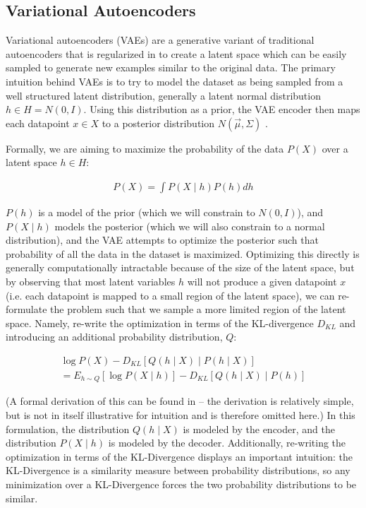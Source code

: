 \subsection{Variational Autoencoders}

Variational autoencoders (VAEs) are a generative variant of
traditional autoencoders that is regularized in to create a latent
space which can be easily sampled to generate new examples similar to
the original data. The primary intuition behind VAEs is to try to
model the dataset as being sampled from a well structured latent
distribution, generally a latent normal distribution $h \in H =
N(0,I)$. Using this distribution as a prior, the VAE encoder then
maps each datapoint $x \in X$ to a posterior distribution
$N(\vec{\mu}, \Sigma)$ \cite{doersch2016tutorial}.

Formally, we are aiming to maximize the probability of the data
$P(X)$ over a latent space $h \in H$:

\begin{align*}
    P(X) = \int P(X \mid h) P(h) dh
\end{align*}

$P(h)$ is a model of the prior (which we will constrain to $N(0,I)$),
and $P(X \mid h)$ models the posterior (which we will also constrain
to a normal distribution), and the VAE attempts to optimize the
posterior such that probability of all the data in the dataset is
maximized. Optimizing this directly is generally computationally
intractable because of the size of the latent space, but by observing
that most latent variables $h$ will not produce a given datapoint $x$
(i.e. each datapoint is mapped to a small region of the latent
space), we can re-formulate the problem such that we sample a more
limited region of the latent space. Namely, re-write the optimization
in terms of the KL-divergence $D_{KL}$ and introducing an additional
probability distribution, $Q$:

\begin{align*}
    \log P(X) - D_{KL}[Q(h \mid X) \mid P(h \mid X)] \\
    = E_{h \sim Q} [\log P(X \mid h)] - D_{KL}[Q(h \mid X) \mid P(h)]
\end{align*}

(A formal derivation of this can be found in
\cite{doersch2016tutorial} – the derivation is relatively simple, but
is not in itself illustrative for intuition and is therefore omitted
here.) In this formulation, the distribution $Q(h \mid X)$ is modeled
by the encoder, and the distribution $P(X \mid h)$ is modeled by the
decoder. Additionally, re-writing the optimization in terms of the
KL-Divergence displays an important intuition: the KL-Divergence is a
similarity measure between probability distributions, so any
minimization over a KL-Divergence forces the two probability
distributions to be similar.

